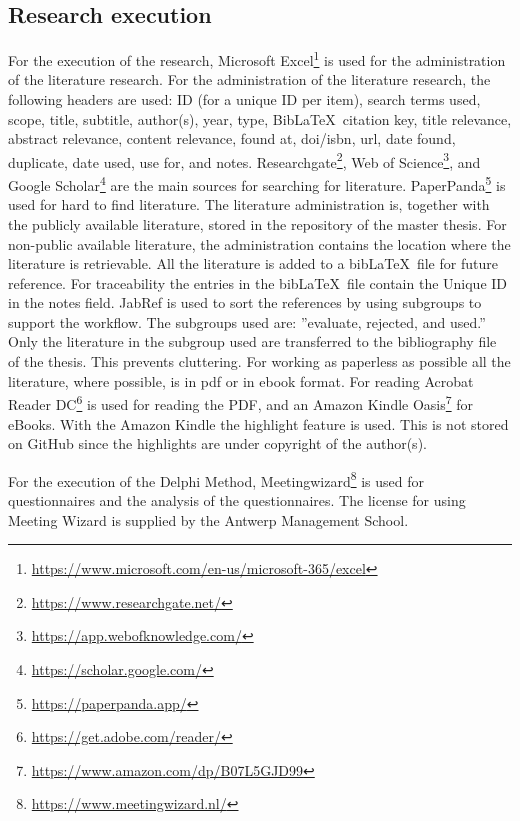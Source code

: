 \subsection{Research execution}
\label{sub:tbresearchexecution}
For the execution of the research, Microsoft Excel\footnote{\url{https://www.microsoft.com/en-us/microsoft-365/excel}} is used for the administration of the literature research. For the administration of the literature research, the following headers are used: ID (for a unique ID per item), search terms used, scope, title, subtitle, author(s), year, type, Bib\LaTeX\ citation key, title relevance, abstract relevance, content relevance, found at, doi/isbn, url, date found, duplicate, date used, use for, and notes. Researchgate\footnote{\url{https://www.researchgate.net/}}, Web of Science\footnote{\url{https://app.webofknowledge.com/}}, and Google Scholar\footnote{\url{https://scholar.google.com/}} are the main sources for searching for literature. PaperPanda\footnote{\url{https://paperpanda.app/}} is used for hard to find literature. The literature administration is, together with the publicly available literature, stored in the repository of the master thesis. For non-public available literature, the administration contains the location where the literature is retrievable. All the literature is added to a bib\LaTeX\ file for future reference. For traceability the entries in the bib\LaTeX\ file contain the Unique ID in the notes field. JabRef is used to sort the references by using subgroups to support the workflow. The subgroups used are: ''evaluate, rejected, and used.'' Only the literature in the subgroup used are transferred to the bibliography file of the thesis. This prevents cluttering. For working as paperless as possible all the literature, where possible, is in pdf or in ebook format. For reading Acrobat Reader DC\footnote{\url{https://get.adobe.com/reader/}} is used for reading the PDF, and an Amazon Kindle Oasis\footnote{\url{https://www.amazon.com/dp/B07L5GJD99}} for eBooks. With the Amazon Kindle the highlight feature is used. This is not stored on GitHub since the highlights are under copyright of the author(s).\par
For the execution of the Delphi Method, Meetingwizard\footnote{\url{https://www.meetingwizard.nl/}} is used for questionnaires and the analysis of the questionnaires. The license for using Meeting Wizard is supplied by the Antwerp Management School.